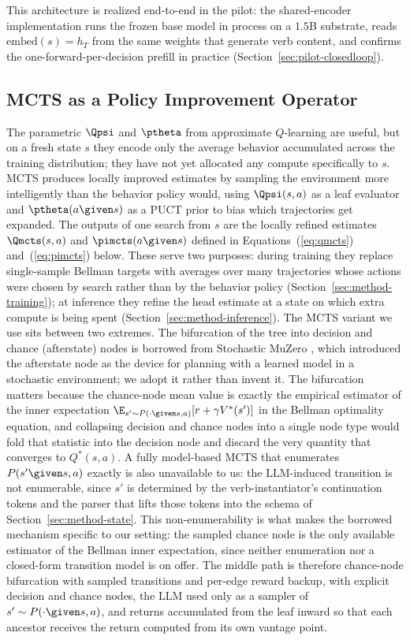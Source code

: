 This architecture is realized end-to-end in the pilot: the shared-encoder
implementation runs the frozen base model in process on a $1.5$B substrate,
reads $\mathrm{embed}(s) = h_T$ from the same weights that generate verb
content, and confirms the one-forward-per-decision prefill in practice
(Section~\ref{sec:pilot-closedloop}).

\subsection{MCTS as a Policy Improvement Operator}
\label{sec:method-mcts}

The parametric $\Qpsi$ and $\ptheta$ from approximate $Q$-learning are
useful, but on a fresh state $s$ they encode only the average behavior
accumulated across the training distribution; they have not yet
allocated any compute specifically to $s$. MCTS produces locally
improved estimates by sampling the environment more intelligently than
the behavior policy would, using $\Qpsi(s, a)$ as a leaf evaluator and
$\ptheta(a \given s)$ as a PUCT prior to bias which trajectories get
expanded. The outputs of one search from $s$ are the locally refined
estimates $\Qmcts(s, a)$ and $\pimcts(a \given s)$ defined in
Equations~(\ref{eq:qmcts}) and~(\ref{eq:pimcts}) below. These serve two
purposes: during training they replace single-sample Bellman targets
with averages over many trajectories whose actions were chosen by
search rather than by the behavior policy (Section~\ref{sec:method-training});
at inference they refine the head estimate at a state on which extra
compute is being spent (Section~\ref{sec:method-inference}). The MCTS
variant we use sits between two extremes. The bifurcation of the tree
into decision and chance (afterstate) nodes is borrowed from Stochastic
MuZero \citep{antonoglou2022stochastic}, which introduced the afterstate
node as the device for planning with a learned model in a stochastic
environment; we adopt it rather than invent it. The bifurcation matters
because the chance-node mean value is exactly the empirical estimator of
the inner expectation
$\E_{s' \sim P(\cdot \given s, a)}[r + \gamma V^{\ast}(s')]$ in the
Bellman optimality equation, and collapsing decision and chance nodes
into a single node type would fold that statistic into the decision node
and discard the very quantity that converges to $Q^{\ast}(s, a)$. A fully
model-based MCTS that enumerates $P(s' \given s, a)$ exactly is also
unavailable to us: the LLM-induced transition is not enumerable, since
$s'$ is determined by the verb-instantiator's continuation tokens and
the parser that lifts those tokens into the schema of
Section~\ref{sec:method-state}. This non-enumerability is what makes the
borrowed mechanism specific to our setting: the sampled chance node is
the only available estimator of the Bellman inner expectation, since
neither enumeration nor a closed-form transition model is on offer. The
middle path is therefore chance-node bifurcation with sampled transitions
and per-edge reward backup, with explicit decision and chance nodes, the
LLM used only as a sampler of $s' \sim P(\cdot \given s, a)$, and returns
accumulated from the leaf inward so that each ancestor receives the return
computed from its own vantage point.

